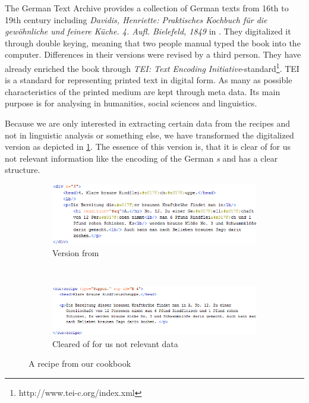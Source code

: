 \documentclass[12pt, twoside]{report}
\newcommand*\longs{{\fontencoding{TS1}\selectfont s}}
\begin{document}
The German Text Archive provides a collection of German texts from 16th to 19th century including \textit{Davidis, Henriette: Praktisches Kochbuch für die gewöhnliche und feinere Küche. 4. Aufl. Bielefeld, 1849} in \parencite{DTA}. They digitalized it through double keying, meaning that two people manual typed the book into the computer. Differences in their versions were revised by a third person. They have already enriched the book through \textit{TEI: Text Encoding Initiative}-standard\footnote{http://www.tei-c.org/index.xml}. TEI is a standard for representing printed text in digital form. As many as possible characteristics of the printed medium are kept through meta data. Its main purpose is for analysing in humanities, social sciences and linguistics.

Because we are only interested in extracting certain data from the recipes and not in linguistic analysis or something else, we have transformed the digitalized version as depicted in \cref{fig:davidisRecipe}. The essence of this version is, that it is clear of for us not relevant information like the encoding of the German \textit{\longs} and has a clear structure. 

\begin{figure}
	\begin{subfigure}{1\textwidth}
		\centering
		\includegraphics[]{Images/davidsRezeptOrig}
		\caption{Version from \parencite{DTA}}
	\end{subfigure} \\
	\begin{subfigure}{1\textwidth}
		\centering
		\includegraphics[]{Images/davidsRezeptTrans1}
		\caption{Cleared of for us not relevant data}
	\end{subfigure}
	\caption{A recipe from our cookbook}
	\label{fig:davidisRecipe}
\end{figure}
\end{document}
